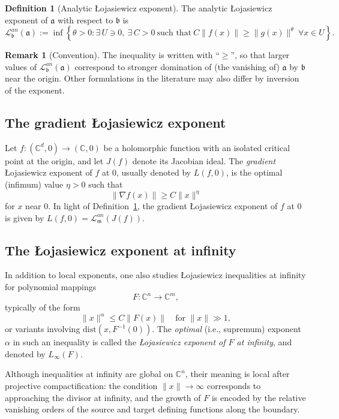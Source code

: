\documentclass[12pt]{amsart}
\newcommand{\CC}{\mathbb{C}}
\newcommand{\m}{\mathfrak m}
\renewcommand{\a}{\mathfrak{a}}
\renewcommand{\b}{\mathfrak{b}}
\newcommand{\Loj}{\mathcal{L}} %
\theoremstyle{plain}
\theoremstyle{definition}
\newtheorem{definition}[theorem]{Definition}
\newtheorem{remark}[theorem]{Remark}
\numberwithin{equation}{section}
\begin{document}
\begin{definition}[Analytic \L{}ojasiewicz exponent]\label{def:analytic-L}
	The analytic \L{}ojasiewicz exponent of $\a$ with respect to $\b$ is
	\[
	\Loj^{an}_\b(\a)
	:=\inf\left\{
	\theta>0 :
	\exists\,U\ni0,\ \exists\,C>0\ \text{such that}\
	C\|f(x)\|\ge \|g(x)\|^{\theta}\ \forall x\in U
	\right\}.
	\]
\end{definition}

\begin{remark}[Convention] \label{rem:convention} 
The inequality is written with ``$\ge$'', so that larger values of
		$\Loj^{an}_\b(\a)$ correspond to stronger domination of (the vanishing of) $\a$ by $\b$ near the
		origin. Other formulations in the literature may also differ by inversion of the exponent. 
\end{remark}

\subsection{The gradient \L{}ojasiewicz exponent}

Let $f:(\CC^d,0)\to(\CC,0)$ be a holomorphic function with an isolated critical
point at the origin, and let $J(f)$ denote its Jacobian ideal. The
\emph{gradient} \L{}ojasiewicz exponent of $f$ at 0, usually denoted by $L(f,0)$, is the optimal (infimum) value $\eta>0$ such that
\[
\|\nabla f(x)\|\ge C\| x\|^{\eta}
\]
for $x$ near $0$. In light of Definition~\ref{def:analytic-L}, the gradient \L{}ojasiewicz exponent of $f$ at 0 is given by $L(f,0) = \Loj^{an}_{\m}(J(f)).$


\subsection{The \L{}ojasiewicz exponent at infinity}

In addition to local exponents, one also studies \L{}ojasiewicz inequalities at
infinity for polynomial mappings
\[
F:\CC^n\to\CC^m,
\]
typically of the form
\[
\|x\|^{\alpha}\le C\|F(x)\|\quad\text{for }\|x\|\gg1,
\]
or variants involving $\mathrm{dist}(x,F^{-1}(0))$. The \emph{optimal} (i.e., supremum) exponent $\alpha$ in such
an inequality is called the\emph{ \L{}ojasiewicz exponent of $F$ at infinity}, and denoted by $L_\infty(F)$.

Although inequalities at infinity are global on $\CC^n$, their meaning
is local after projective compactification: the condition $\|x\|\to\infty$ corresponds to approaching
the divisor at infinity, and the growth of $F$ is encoded by the relative vanishing orders of the
source and target defining functions along the boundary.
\end{document}
